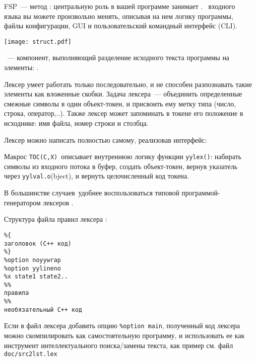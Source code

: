 FSP\ --- метод : центральную роль в вашей программе занимает
.
\ входного языка вы можете произвольно менять,
описывая на нем логику программы, файлы конфигурации, GUI и пользовательский
командный интерфейс (CLI).


\texttt{[image: struct.pdf]}

\secdown


\ --- компонент, выполняющий разделение исходного 
текста программы на элементы: .

\bigskip
Лексер умеет работать только последовательно, и не способен разпознавать такие
элементы как вложенные скобки. Задача лексера\ --- объединить определенные
смежные символы в один объект-токен, и присвоить ему метку типа (число, строка, 
оператор,..). Также лексер может запоминать в токене его положение в 
исходнике: имя файла, номер строки и столбца.

Лексер можно написать полностью самому, реализовав интерфейс:

Макрос \verb|TOC(C,X)|\ описывает внутреннюю логику функции \verb|yylex()|:
набирать символы из входного потока в буфер, создать объект-токен, вернув 
указатель через \verb|yylval.o|(bject), и вернуть целочисленный код токена.

\bigskip
В большинстве случаев\ удобнее воспользоваться типовой программой-генератором
лексеров .

Структура файла правил лексера :
\begin{verbatim}
%{
заголовок (С++ код)
%}
%option noyywrap
%option yylineno
%x state1 state2..
%%
правила
%%
необязательный С++ код
\end{verbatim}

Если в файл лексера добавить опцию \verb|%option main|, полученный код лексера
можно скомпилировать как самостоятельную программу, и использовать ее как
инструмент интеллектуального поиска/замены текста, как пример
см. файл \verb|doc/src2lst.lex|



